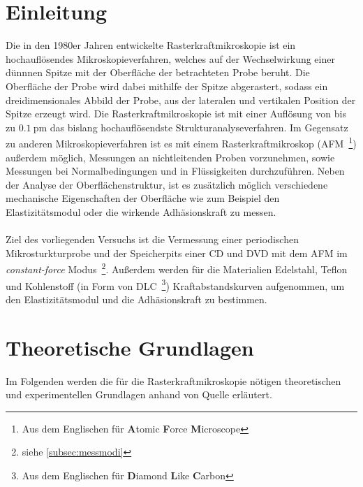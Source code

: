 \setcounter{page}{1}
\section*{Einleitung}
Die in den 1980er Jahren entwickelte Rasterkraftmikroskopie ist ein hochauflösendes Mikroskopieverfahren, welches auf der Wechselwirkung einer dünnnen Spitze mit der Oberfläche der betrachteten Probe beruht. Die Oberfläche der Probe wird dabei mithilfe der Spitze abgerastert, sodass ein dreidimensionales Abbild der Probe, aus der lateralen und vertikalen Position der Spitze erzeugt wird. Die Rasterkraftmikroskopie ist mit einer Auflösung von bis zu $\SI{0,1}{\pico\meter}$ das bislang hochauflösendste Strukturanalyseverfahren. Im Gegensatz zu anderen Mikroskopieverfahren ist es mit einem Rasterkraftmikroskop (AFM~\footnote{Aus dem Englischen für \textbf{A}tomic \textbf{F}orce \textbf{M}icroscope}) außerdem möglich, Messungen an nichtleitenden Proben vorzunehmen, sowie Messungen bei Normalbedingungen und in Flüssigkeiten durchzuführen. Neben der Analyse der Oberflächenstruktur, ist es zusätzlich möglich verschiedene mechanische Eigenschaften der Oberfläche wie zum Beispiel den Elastizitätsmodul oder die wirkende Adhäsionskraft zu messen. \\
\\
Ziel des vorliegenden Versuchs ist die Vermessung einer periodischen Mikrosturkturprobe und der Speicherpits einer CD und DVD mit dem AFM im \textit{constant-force} Modus~\footnote{siehe \autoref{subsec:messmodi}}. Außerdem werden für die Materialien Edelstahl, Teflon und Kohlenstoff (in Form von DLC~\footnote{Aus dem Englischen für \textbf{D}iamond \textbf{L}ike \textbf{C}arbon}) Kraftabstandskurven aufgenommen, um den Elastizitätsmodul und die Adhäsionskraft zu bestimmen.
\newpage
\section{Theoretische Grundlagen}
Im Folgenden werden die für die Rasterkraftmikroskopie nötigen theoretischen und experimentellen Grundlagen anhand von Quelle \cite{Voigt} erläutert.
